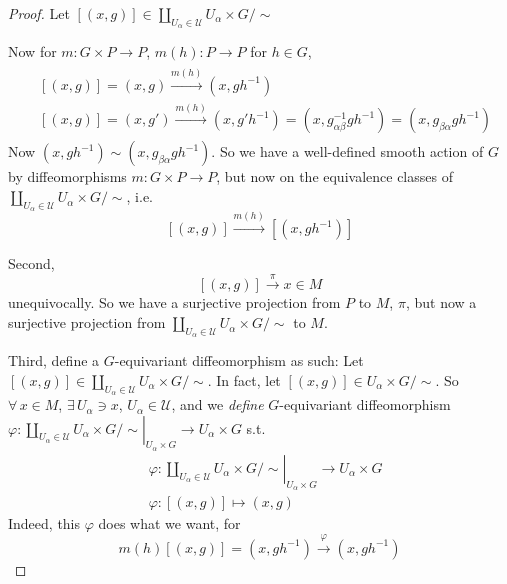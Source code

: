 \documentclass[10pt]{amsart}
\begin{document}
\begin{multicols*}{2}
\begin{proof}
  Let $[(x,g)] \in \coprod_{U_{\alpha} \in \mathcal{U}} U_{\alpha} \times G / \sim$

  Now for $m : G \times P \to P$, $m(h) : P \to P$ for $h\in G$, 
  \[
\begin{gathered}
  \begin{aligned}
    & [(x,g)] =(x,g) \xrightarrow{ m(h)}(x,gh^{-1}) \\ 
    & [(x,g)] = (x,g') \xrightarrow{ m(h)} (x,g'h^{-1}) = (x,g^{-1}_{\alpha \beta} gh^{-1}) = (x,g_{\beta \alpha} gh^{-1})
  \end{aligned}
\end{gathered}
\]
Now $(x,gh^{-1}) \sim (x,g_{\beta \alpha} gh^{-1})$.  So we have a well-defined smooth action of $G$ by diffeomorphisms $m: G\times P \to P$, but now on the equivalence classes of $\coprod_{U_{\alpha} \in \mathcal{U}} U_{\alpha}\times G/\sim$, i.e.
\[
[(x,g)] \xrightarrow{ m(h)} [(x,gh^{-1})]
\]  

Second, 
\[
[(x,g)] \xrightarrow{ \pi} x\in M
\]
unequivocally.  So we have a surjective projection from $P$ to $M$, $\pi$, but now a surjective projection from $\coprod_{U_{\alpha} \in \mathcal{U}} U_{\alpha}\times G/\sim$ to $M$.



Third, define a $G$-equivariant diffeomorphism as such: Let $[(x,g)] \in \coprod_{U_{\alpha} \in \mathcal{U}} U_{\alpha}\times G/\sim$.  In fact, let $[(x,g)] \in U_{\alpha}\times G/\sim$.  So $\forall \, x \in M$, $\exists \, U_{\alpha} \ni x$, $U_{\alpha} \in \mathcal{U}$, and we \emph{define} $G$-equivariant diffeomorphism $\varphi : \left. \coprod_{U_{\alpha} \in \mathcal{U}} U_{\alpha}\times G/\sim \right|_{U_{\alpha}\times G} \to U_{\alpha}\times G$ s.t.
\begin{equation}
  \begin{aligned}
&    \varphi : \left. \coprod_{U_{\alpha} \in \mathcal{U}} U_{\alpha}\times G/\sim \right|_{U_{\alpha}\times G} \to U_{\alpha}\times G \\
& \varphi : [(x,g)] \mapsto (x,g)
  \end{aligned}
\end{equation}
Indeed, this $\varphi$ does what we want, for 
\[
m(h)[(x,g)] = (x,gh^{-1}) \xrightarrow{\varphi} (x,gh^{-1})
\]


\end{proof}
\end{multicols*}
\end{document}
